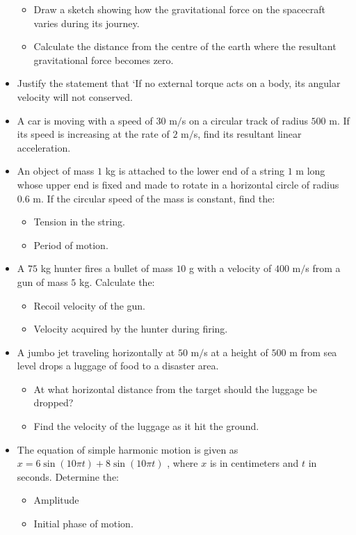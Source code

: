\documentclass{article}
\begin{document}
\begin{itemize}
 \begin{itemize}
\item Draw a sketch showing how the gravitational force on the spacecraft varies during its journey. 
\item Calculate the distance from the centre of the earth where the resultant gravitational force becomes zero. 
\end{itemize}
\item Justify the statement that ‘If no external torque acts on a body, its angular velocity will not conserved.
\item A car is moving with a speed of $ 30$ m$/$s on a circular track of radius $ 500$ m. If its speed is increasing at the rate of $ 2$ m$/$s, find its resultant linear acceleration.
\item An object of mass $ 1$ kg is attached to the lower end of a string $ 1$ m long whose upper end is fixed and made to rotate in a horizontal circle of radius $ 0.6$ m. If the circular speed of the mass is constant, find the:
 \begin{itemize}
\item Tension in the string. 
\item Period of motion. 
\end{itemize}
\item A $ 75$ kg hunter fires a bullet of mass $ 10$ g with a velocity of $ 400$ m$/$s from a gun of mass $ 5$ kg. Calculate the:
 \begin{itemize}
\item Recoil velocity of the gun. 
\item Velocity acquired by the hunter during firing.
\end{itemize}
\item A jumbo jet traveling horizontally at $ 50$ m$/$s at a height of $ 500$ m from sea level drops a luggage of food to a disaster area.
 \begin{itemize}
\item At what horizontal distance from the target should the luggage be dropped?
\item Find the velocity of the luggage as it hit the ground. 
\end{itemize}
\item The equation of simple harmonic motion is given as $ x=6 \sin(10\pi t)+8 \sin(10\pi t)$ , where $ x$ is in centimeters and $ t$ in seconds. Determine the:
 \begin{itemize}
\item Amplitude 
\item Initial phase of motion. 

\end{itemize}
\end{itemize}
\end{document}
